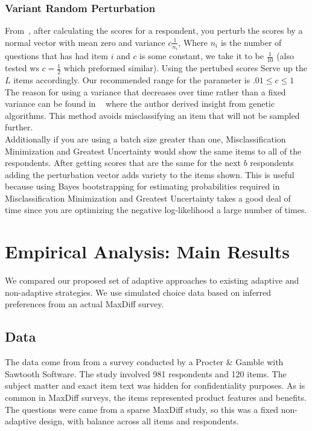 \documentclass[nonblindrev]{informs3}
\begin{document}
\subsubsection{Variant Random Perturbation}
From~\cite{toubia2007adaptive}, after calculating the scores for a respondent, you perturb the scores by a normal vector with mean zero and variance $c\frac{1}{n_i}$, Where $n_i$ is the number of questions that has had item $i$ and $c$ is some constant, we take it to be $\frac{1}{10}$ (also tested ws $c=\frac{1}{2}$ which preformed similar). Using the pertubed scores Serve up the $L$ items accordingly. Our recommended range for the parameter is $.01 \leq c \leq 1$\\
The reason for using a variance that decreases over time rather than a fixed variance can be found in ~\cite{toubia2007adaptive} where the author derived insight from genetic algorithms. This method avoids misclassifying an item that will not be sampled further.\\
Additionally if you are using a batch size greater than one, Misclassification Minimization and Greatest Uncertainty would show the same items to all of the respondents. After getting scores that are the same for the next $b$ respondents adding the perturbation vector adds variety to the items shown. This is useful because using Bayes bootstrapping for estimating probabilities required in Misclassification Minimization and Greatest Uncertainty takes a good deal of time since you are optimizing the negative log-likelihood a large number of times.


\section{Empirical Analysis: Main Results}
\label{sec:empirical_main}
We compared our proposed set of adaptive approaches to existing adaptive and non-adaptive strategies. We use simulated choice data based on inferred preferences from an actual MaxDiff survey.

\subsection{Data}
The data come from from a survey conducted by a Procter \& Gamble with Sawtooth Software. The study involved 981 respondents and 120 items. The subject matter and exact item text was hidden for confidentiality purposes. As is common in MaxDiff surveys, the items represented product features and benefits. The questions were came from a sparse MaxDiff study, so this was a fixed non-adaptive design, with balance across all items and respondents. 
\end{document}

